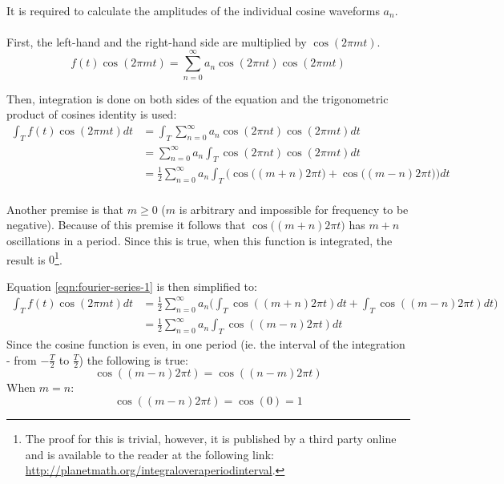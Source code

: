 \documentclass{article}
\begin{document}
\paragraph*{}
It is required to calculate the amplitudes of the individual cosine waveforms 
$a_n$.

\paragraph*{}
First, the left-hand and the right-hand side are multiplied by $\cos(2 \pi m t)$.
$$f(t) \cos(2 \pi m t) = \sum^{\infty}_{n=0}a_n \cos(2 \pi n t) \cos(2 \pi m t)$$

Then, integration is done on both sides of the equation and the trigonometric 
product of cosines identity is used:
\begin{equation}
	\begin{aligned}
		\int_{T} f(t) \cos(2 \pi m t) dt &= 
		\int_{T} \sum^{\infty}_{n=0} a_n \cos(2 \pi n t) \cos(2 \pi m t) dt \\
		&= \sum^{\infty}_{n=0} a_n \int_{T} \cos(2 \pi n t) \cos(2 \pi m t) dt \\
		&= \frac{1}{2} \sum^{\infty}_{n=0} a_n \int_{T} \Big(\cos \big( (m + n) 2 \pi t \big) + \cos \big( (m - n) 2 \pi t \big) \Big) dt \\
	\end{aligned}
	\label{eqn:fourier-series-1}
\end{equation}

Another premise is that $m \geq 0$ ($m$ is arbitrary and impossible for
frequency to be negative). Because of this premise it follows that $\cos \big(
(m + n) 2 \pi t \big)$ has $m + n$ oscillations in a period. Since this is true,
when this function is integrated, the result is $0$\footnote{The proof for this
is trivial, however, it is published by a third party online and is available to
the reader at the following link:
\url{http://planetmath.org/integraloveraperiodinterval}.}.

Equation \ref{eqn:fourier-series-1} is then simplified to:
\begin{equation}
	\begin{aligned}
		\int_{T} f(t) \cos(2 \pi m t) dt &=
		\frac{1}{2} \sum^{\infty}_{n=0} a_n \bigg(\int_{T} \cos( (m + n) 2 \pi t) dt + 
		\int_{T} \cos( (m - n) 2 \pi t) dt \bigg) \\
		&= \frac{1}{2} \sum^{\infty}_{n=0} a_n \int_{T} \cos( (m - n) 2 \pi t) dt
	\end{aligned}
	\label{eqn:fourier-series-2}
\end{equation}
Since the cosine function is even, in one period (ie. the interval of the
integration - from $-\frac{T}{2}$ to $\frac{T}{2}$) the following is true:
$$\cos( (m - n) 2 \pi t) = \cos( (n - m) 2 \pi t)$$
When $m = n$:
$$\cos( (m - n) 2 \pi t) = \cos(0) = 1$$
\end{document}
